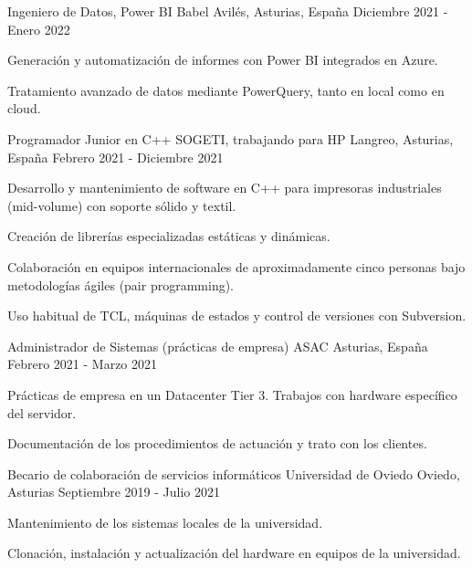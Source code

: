 \begin{cventries}
    \cventry
    {Ingeniero de Datos, Power BI} %
    {Babel} %
    {Avilés, Asturias, España} %
    {Diciembre 2021 - Enero 2022} %
    {
        \begin{cvitems}
            \item {Generación y automatización de informes con Power BI integrados en Azure.}
            \item {Tratamiento avanzado de datos mediante PowerQuery, tanto en local como en cloud.}
        \end{cvitems}
    }
    \cventry
    {Programador Junior en C++} %
    {SOGETI, trabajando para HP} %
    {Langreo, Asturias, España} %
    {Febrero 2021 - Diciembre 2021} %
    {
        \begin{cvitems}
            \item {Desarrollo y mantenimiento de software en C++ para impresoras industriales (mid-volume) con soporte sólido y textil.}
            \item {Creación de librerías especializadas estáticas y dinámicas.}
            \item {Colaboración en equipos internacionales de aproximadamente cinco personas bajo metodologías ágiles (pair programming).}
            \item {Uso habitual de TCL, máquinas de estados y control de versiones con Subversion.}
        \end{cvitems}
    }
    \cventry
    {Administrador de Sistemas (prácticas de empresa)} %
    {ASAC} %
    {Asturias, España} %
    {Febrero 2021 - Marzo 2021} %
    {
        \begin{cvitems}
            \item {Prácticas de empresa en un Datacenter Tier 3. Trabajos con hardware específico del servidor.}
            \item {Documentación de los procedimientos de actuación y trato con los clientes.}
        \end{cvitems}
    }
    \cventry
    {Becario de colaboración de servicios informáticos} %
    {Universidad de Oviedo} %
    {Oviedo, Asturias} %
    {Septiembre 2019 - Julio 2021} %
    {
        \begin{cvitems}
            \item {Mantenimiento de los sistemas locales de la universidad.}
            \item {Clonación, instalación y actualización del hardware en equipos de la universidad.}
        \end{cvitems}
    }
\end{cventries}
